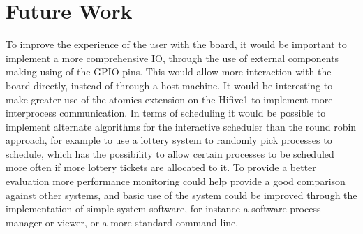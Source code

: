 \section{Future Work}
To improve the experience of the user with the board, it would be important to implement a more comprehensive IO, through the use of external components making using of the GPIO pins. This would allow more interaction with the board directly, instead of through a host machine. It would be interesting to make greater use of the atomics extension on the Hifive1 to implement more interprocess communication. In terms of scheduling it would be possible to implement alternate algorithms for the interactive scheduler than the round robin approach, for example to use a lottery system to randomly pick processes to schedule, which has the possibility to allow certain processes to be scheduled more often if more lottery tickets are allocated to it. To provide a better evaluation more performance monitoring could help provide a good comparison against other systems, and basic use of the system could be improved through the implementation of simple system software, for instance a software process manager or viewer, or a more standard command line.
